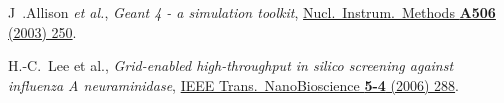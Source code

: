 \documentclass{elsart}
\def\etal {\textit{et al.}}
\begin{document}
\begin{thebibliography}{00}
 J~.Allison \etal,
\textit{Geant 4 - a simulation toolkit},
\href{http://dx.doi.org/10.1016/S0168-9002(03)01368-8}
{Nucl.\ Instrum.\ Methods \textbf{A506} (2003) 250}.

 H.-C.\ Lee et al.,
\textit{Grid-enabled high-throughput in silico screening against influenza A
neuraminidase},
\href{http://dx.doi.org/10.1109/TNB.2006.887943}
{IEEE Trans.\ NanoBioscience \textbf{5-4} (2006) 288}.






\end{thebibliography}
\end{document}
